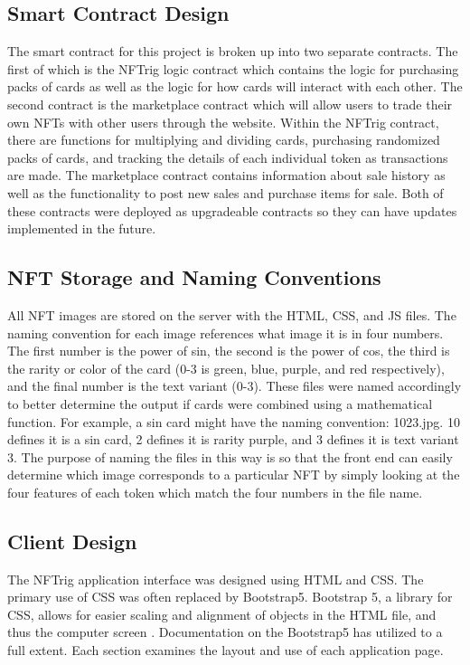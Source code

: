 \documentclass[acmsmall,nonacm]{acmart}
\begin{document}
\subsection{Smart Contract Design}
The smart contract for this project is broken up into two separate contracts. The first of which is the NFTrig logic contract which contains the logic for purchasing packs of cards as well as the logic for how cards will interact with each other. The second contract is the marketplace contract which will allow users to trade their own NFTs with other users through the website. Within the NFTrig contract, there are functions for multiplying and dividing cards, purchasing randomized packs of cards, and tracking the details of each individual token as transactions are made. The marketplace contract contains information about sale history as well as the functionality to post new sales and purchase items for sale. Both of these contracts were deployed as upgradeable contracts so they can have updates implemented in the future.

\subsection{NFT Storage and Naming Conventions} 
All NFT images are stored on the server with the HTML, CSS, and JS files. The naming convention for each image references what image it is in four numbers. The first number is the power of sin, the second is the power of cos, the third is the rarity or color of the card (0-3 is green, blue, purple, and red respectively), and the final number is the text variant (0-3). These files were named accordingly to better determine the output if cards were combined using a mathematical function. For example, a sin card might have the naming convention: 1023.jpg. 10 defines it is a sin card, 2 defines it is rarity purple, and 3 defines it is text variant 3. The purpose of naming the files in this way is so that the front end can easily determine which image corresponds to a particular NFT by simply looking at the four features of each token which match the four numbers in the file name.

\subsection{Client Design} 
The NFTrig application interface was designed using HTML and CSS. The primary use of CSS was often replaced by Bootstrap5. Bootstrap 5, a library for CSS, allows for easier scaling and alignment of objects in the HTML file, and thus the computer screen \cite{krause2020introduction}. Documentation on the Bootstrap5 has utilized to a full extent. Each section examines the layout and use of each application page.
\end{document}

